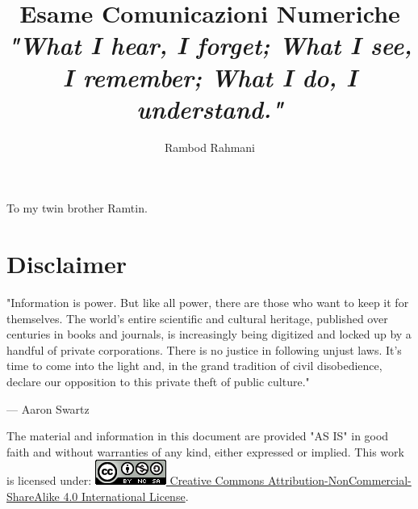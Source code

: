 \documentclass[12pt,oneside,openany]{memoir}
\title{%
	Esame Comunicazioni Numeriche\\
	\vspace{1cm}
	\large \textit{
		"What I hear, I forget;
		What I see, I remember;
		What I do, I understand."
	}}
\author{Rambod Rahmani}
\numberwithin{equation}{subsection}
\newenvironment{dedication}
{
	\afterpage{\blankpage}
	\clearpage
	\thispagestyle{empty}
	\vspace*{\stretch{1}}
	\itshape
	\raggedleft
	\afterpage{\blankpage}
}
{
	\par
	\vspace{\stretch{1}}
	\clearpage
}
\newcommand{\blankpage}
{
    \null
    \thispagestyle{empty}%
    \addtocounter{page}{-1}%
    \newpage
}
\begin{document}
\renewcommand{\rmdefault}{cmr}

\maketitle
{}

\begin{dedication}
To my twin brother Ramtin.
\end{dedication}


\newpage
{}
\tableofcontents
\afterpage{\blankpage}

\newpage
{}


\chapter{Disclaimer}
\epigraph{"Information is power. But like all power, there are those who want
to keep it for themselves. The world's entire scientific and cultural heritage,
published over centuries in books and journals, is increasingly being digitized
and locked up by a handful of private corporations. There is no justice in
following unjust laws. It's time to come into the light and, in the grand
tradition of civil disobedience, declare our opposition to this private theft
of public culture."}{--- \textup{Aaron Swartz}}

The material and information in this document are provided "AS IS" in good faith
and without warranties of any kind, either expressed or implied.
\bigbreak\noindent
This work is licensed under:
\bigbreak\noindent
\href{http://creativecommons.org/licenses/by-nc-sa/4.0/}{
	\includegraphics[height=\baselineskip]{images/cc_88x31.png} 
	Creative Commons Attribution-NonCommercial-ShareAlike 4.0 International 
	License}.

\end{document}
